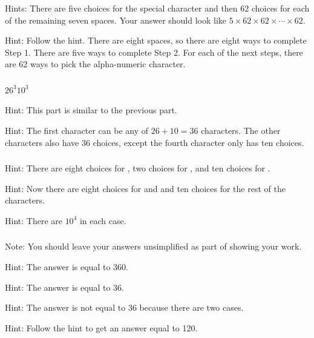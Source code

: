 \subsubsection*{ \answers}
    \begin{apart}
        \item Hints: There are five choices for the special character and then 62 choices for each of the remaining seven spaces.  Your answer should look like $5 \times 62 \times 62 \times \cdots \times 62$.
        \item Hint: Follow the hint. There are eight spaces, so there are eight ways to complete Step 1.  There are five ways to complete Step 2.  For each of the next steps, there are 62 ways to pick the alpha-numeric character.
    \end{apart}
    
\subsubsection*{ \answers}
    \begin{apart}
        \item $26^3 10^3$
        \item Hint: This part is similar to the previous part.
        \item Hint: The first character can be any of $26+10=36$ characters.  The other characters also have 36 choices, except the fourth character only has ten choices.
    \end{apart}
    
\subsubsection*{ \answers}
    \begin{apart}
        \item Hint: There are eight choices for , two choices for , and ten choices for .
    
        \item Hint: Now there are eight choices for  and  and ten choices for the rest of the characters.

        \item Hint: There are $10^4$ in each case.
    \end{apart}
    
\subsubsection*{ \answers}
Note: You should leave your answers unsimplified as part of showing your work.
    \begin{apart}
        \item Hint: The answer is equal to 360. 
        \item Hint: The answer is equal to 36.
        \item Hint: The answer is not equal to 36 because there are two cases.
        \item Hint: Follow the hint to get an answer equal to 120.
    \end{apart}

